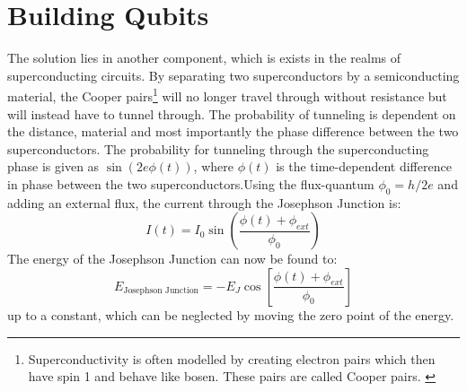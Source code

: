 \section{Building Qubits}
The solution lies in another component, which is exists in the realms of superconducting circuits. By separating two superconductors by a semiconducting material, the Cooper pairs\footnote{Superconductivity is often modelled by creating electron pairs which then have spin 1 and behave like bosen. These pairs are called Cooper pairs. \cite{BCS}} will no longer travel through without resistance but will instead have to tunnel through. The probability of tunneling is dependent on the distance, material and most importantly the phase difference between the two superconductors. The probability for tunneling through the superconducting phase is given as $\sin(2e\phi(t))$, where $\phi(t)$ is the time-dependent difference in phase between the two superconductors.Using the flux-quantum $\phi_0 = h / 2e$ and adding an external flux, the current through the Josephson Junction is:
\begin{equation}
    I(t) = I_0 \sin \left( \frac{\phi(t) + \phi_{ext}}{\phi_0} \right)
\end{equation}
The energy of the Josephson Junction can now be found to\cite{krantz_week_2019}: 
\begin{equation}
    E_{\text{Josephson Junction}} = - E_J \cos \left[ \frac{\phi(t) + \phi_{ext}}{\phi_0} \right]
\end{equation}
up to a constant, which can be neglected by moving the zero point of the energy. \cite{vool_introduction_2017}

